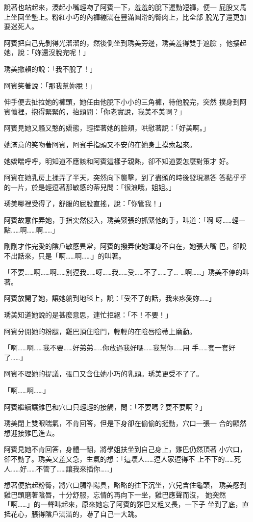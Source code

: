 說著也站起來，湊起小嘴輕吻了阿賓一下，羞羞的脫下運動短褲，便一
屁股又馬上坐回坐墊上。粉紅小巧的內褲繃滿在豐滿圓滑的臀肉上，比全部
脫光了還更加要迷死人。

阿賓把自己先剝得光溜溜的，然後側坐到琇美旁邊，琇美羞得雙手遮臉
，他摟起她，說：「妳還沒脫完呢！」

琇美撒賴的說：「我不脫了！」

阿賓笑著說：「那我幫妳脫！」

伸手便去扯拉她的褲頭，她任由他脫下小小的三角褲，待他脫完，突然
撲身到阿賓懷裡，抱得緊緊的，抬頭問：「你老實說，我美不美啊？」

阿賓見她又騷又憨的嬌態，輕捏著她的臉頰，哄慰著說：「好美啊。」

她滿意的笑吻著阿賓，阿賓手指頭又不安的在她身上摸索起來。

她嬌喘呼呼，明知道不應該和阿賓這樣子親熱，卻不知道要怎麼對策才
好。

阿賓在她乳房上揉弄了半天，突然向下襲擊，到了盡頭的時後發現濕答
答黏乎乎的一片，於是輕逗著那敏感的蒂兒問：「很浪哦，姐姐。」

琇美哪裡受得了，舒服的屁股直搖，說：「你管我！」

阿賓故意作弄她，手指突然侵入，琇美緊張的抓緊他的手，叫道：「啊
呀……輕一點……啊……啊……」

剛剛才作完愛的陰戶敏感異常，阿賓的撥弄使她渾身不自在，她張大嘴
巴，卻說不出話來，只是「啊……啊……」的叫著。

「不要……啊……啊……別逗我……呀……我……受……不了……了…
…啊……」琇美不停的叫著。

阿賓放開了她，讓她躺到地毯上，說：「受不了的話，我來疼愛妳……」

琇美知道她說的是甚麼意思，連忙拒絕：「不！不要！」

阿賓分開她的粉腿，雞巴頂住陰門，輕輕的在陰唇陰蒂上磨動。

「啊……啊……我不要……好弟弟……你放過我好嗎……我幫你……用
手……套一套好了……」

阿賓不理她的提議，張口又含住她小巧的乳頭。琇美更受不了了。

「啊……啊……」

阿賓繼續讓雞巴和穴口只輕輕的接觸，問：「不要嗎？要不要啊？」

琇美閉上雙眼喘氣，不肯回答，但是下身卻在偷偷的挺動，穴口一張一
合的顯然想迎接雞巴進去。

阿賓見她不肯回答，身體一翻，將學姐扶坐到自己身上，雞巴仍然頂著
小穴口，卻不動了。琇美又羞又急，生氣的想：「這壞人……逗人家逗得不
上不下的……死人……好……不管了……讓我來插你……」

想著便抬起粉臀，將穴口觸準陽具，略略的往下沉坐，穴兒含住龜頭，
琇美感到雞巴頭磨著陰唇，十分舒服，忘情的再向下一坐，雞巴應聲而沒，
她突然「啊……」的一聲叫起來，原來她忘了阿賓的雞巴又粗又長，一下子
坐到了底，直抵花心，脹得陰戶滿滿的，嚇了自己一大跳。

